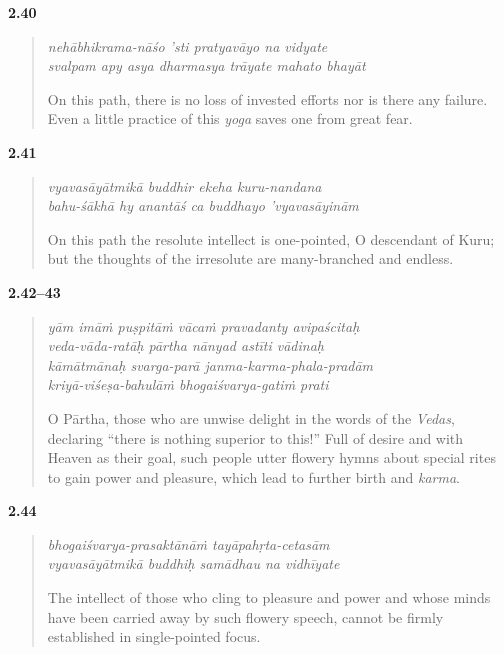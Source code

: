 \par\noindent\textbf{2.40}\par
\begin{verse}
\textit{nehābhikrama-nāśo ’sti pratyavāyo na vidyate} \\
\textit{svalpam apy asya dharmasya trāyate mahato bhayāt}

\noindent On this path, there is no loss of invested efforts nor is there any failure. Even a little practice of this \textit{yoga} saves one from great fear.
\end{verse}
\par



\par\noindent\textbf{2.41}\par
\begin{verse}
\textit{vyavasāyātmikā buddhir ekeha kuru-nandana} \\
\textit{bahu-śākhā hy anantāś ca buddhayo ’vyavasāyinām}

\noindent On this path the resolute intellect is one-pointed, O descendant of Kuru; but the thoughts of the irresolute are many-branched and endless.
\end{verse}
\par



\par\noindent\textbf{2.42–43}\par
\begin{verse}
\textit{yām imāṁ puṣpitāṁ vācaṁ pravadanty avipaścitaḥ} \\
\textit{veda-vāda-ratāḥ pārtha nānyad astīti vādinaḥ} \\
\textit{kāmātmānaḥ svarga-parā janma-karma-phala-pradām} \\
\textit{kriyā-viśeṣa-bahulāṁ bhogaiśvarya-gatiṁ prati}

\noindent O Pārtha, those who are unwise delight in the words of the \textit{Vedas}, declaring \enquote{there is nothing superior to this!} Full of desire and with Heaven as their goal, such people utter flowery hymns about special rites to gain power and pleasure, which lead to further birth and \textit{karma}.
\end{verse}
\par



\par\noindent\textbf{2.44}\par
\begin{verse}
\textit{bhogaiśvarya-prasaktānāṁ tayāpahṛta-cetasām} \\
\textit{vyavasāyātmikā buddhiḥ samādhau na vidhīyate}

\noindent The intellect of those who cling to pleasure and power and whose minds have been carried away by such flowery speech, cannot be firmly established in single-pointed focus.
\end{verse}
\par


